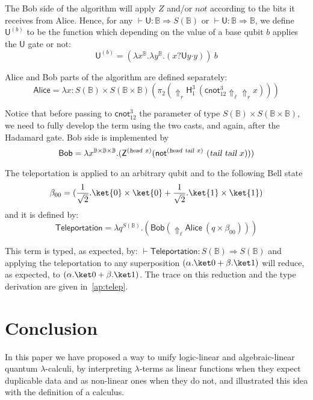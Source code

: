 \documentclass[preprint]{elsarticle}
\newcommand\B{\ensuremath{\mathbb B}}
\newcommand\ite[3]{{#1}?{#2}\mathord{\cdot}{#3}}
\newcommand\pair[2]{({#1}+{#2})}
\newcommand\s[1]{\ensuremath{\mathsf{#1}}}
\newcommand\head{\text{\sl head}}
\newcommand\tail{\text{\sl tail}}
\begin{document}
The Bob side of the algorithm will apply $Z$ and/or $\mathit{not}$ according to
the bits it receives from Alice. Hence, for any $\vdash \s U:\B\Rightarrow
S(\B)$ or $\vdash \s U:\B\Rightarrow\B$, we define $\s U^{(b)}$ to be the
function which depending on the value of a base qubit $b$ applies the $\s U$
gate or not:
\[
  \s U^{(b)} =(\lambda x^{\B}.\lambda y^{\B}.(\ite x{\s Uy}y))\ b
\]

Alice and Bob parts of the algorithm are defined separately:
\[
  \s{Alice} = \lambda x:S(\B)\times S(\B\times
  \B)(\pi_2(\Uparrow_r\s
  H^3_1~(\s{cnot}^3_{12}\Uparrow_\ell\Uparrow_r x)))
\]

Notice that before passing to $\s{cnot}_{12}^3$ the parameter of type
$S(\B)\times S(\B\times\B)$, we need to fully develop the term using the two
casts, and again, after the Hadamard gate. Bob side is implemented by
\[ \s{Bob} = \lambda x^{\B\times\B\times\B}.(\s Z^{(\head~x)}(\s{not}^{(\head\
    \tail\ x)}~(\tail~\tail~x)))\]

The teleportation is applied to an arbitrary qubit and to the following Bell
state
\[\beta_{00} = \pair{\frac 1{\sqrt 2}.\ket{0} \times \ket{0}}{\frac
    1{\sqrt 2}.\ket{1} \times \ket{1}}\] and it is defined by:
\[\s{Teleportation} = \lambda q^{S(\B)}.(\s{Bob}(\Uparrow_\ell \s{Alice}~(q\times\beta_{00})))\]

This term is typed, as expected, by: $\vdash\s{Teleportation}:S(\B)\Rightarrow
S(\B)$ and applying the teleportation to any superposition $\pair{\alpha.\ket
  0}{\beta.\ket 1}$ will reduce, as expected, to $\pair{\alpha.\ket
  0}{\beta.\ket 1}$. The trace on this reduction and the type derivation are
given in~\ref{ap:telep}.

\section{Conclusion}\label{sec:conclusion}

In this paper we have proposed a way to unify logic-linear and algebraic-linear
quantum $\lambda$-calculi, by interpreting $\lambda$-terms as linear functions
when they expect duplicable data and as non-linear ones when they do not, and
illustrated this idea with the definition of a calculus.
\end{document}
